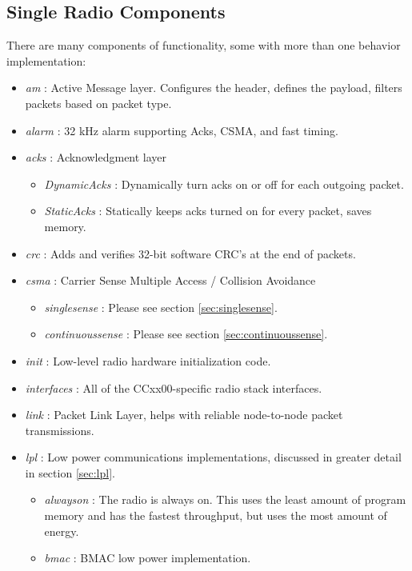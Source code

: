 \documentclass{article}
\begin{document}
\subsection{Single Radio Components}
\label{sec:singleradiocomponents}
There are many components of functionality, some with more than one behavior implementation:

\begin{itemize}
	\item \emph{am} : Active Message layer. Configures the header, defines the payload, filters packets
	based on packet type.
	\item \emph{alarm} : 32 kHz alarm supporting Acks, CSMA, and fast timing.
	\item \emph{acks} : Acknowledgment layer
	  \begin{itemize}
	    \item \emph{DynamicAcks} : Dynamically turn acks on or off for each outgoing packet.
	    \item \emph{StaticAcks} : Statically keeps acks turned on for every packet, saves memory.
	  \end{itemize}
	\item \emph{crc} : Adds and verifies 32-bit software CRC's at the end of packets.
	\item \emph{csma} : Carrier Sense Multiple Access / Collision Avoidance
	  \begin{itemize}
	    \item \emph{singlesense} : Please see section \ref{sec:singlesense}.
	    \item \emph{continuoussense} : Please see section \ref{sec:continuoussense}.
	  \end{itemize}
	\item \emph{init} : Low-level radio hardware initialization code.
	\item \emph{interfaces} : All of the CCxx00-specific radio stack interfaces.
	\item \emph{link} : Packet Link Layer, helps with reliable node-to-node packet transmissions.
	\item \emph{lpl} : Low power communications implementations, discussed in greater detail in section \ref{sec:lpl}.
	  \begin{itemize}
	    \item \emph{alwayson} : The radio is always on. This uses the least amount of 
	    program memory and has the fastest throughput, but uses the most amount of energy.
	    \item \emph{bmac} : BMAC \cite{bmac} low power implementation. 

\end{itemize}
\end{itemize}
\end{document}
